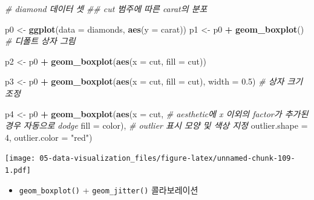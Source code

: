 \documentclass[
  11pt,
]{krantz}
\newenvironment{Shaded}{\begin{snugshade}}{\end{snugshade}}
\newcommand{\CommentTok}[1]{\textcolor[rgb]{0.37,0.37,0.37}{\textit{#1}}}
\newcommand{\DataTypeTok}[1]{\textcolor[rgb]{0.27,0.27,0.27}{#1}}
\newcommand{\DecValTok}[1]{\textcolor[rgb]{0.06,0.06,0.06}{#1}}
\newcommand{\FloatTok}[1]{\textcolor[rgb]{0.06,0.06,0.06}{#1}}
\newcommand{\KeywordTok}[1]{\textcolor[rgb]{0.27,0.27,0.27}{\textbf{#1}}}
\newcommand{\NormalTok}[1]{#1}
\newcommand{\OperatorTok}[1]{\textcolor[rgb]{0.43,0.43,0.43}{\textbf{#1}}}
\newcommand{\StringTok}[1]{\textcolor[rgb]{0.5,0.5,0.5}{#1}}
\providecommand{\tightlist}{%
  \setlength{\itemsep}{0pt}\setlength{\parskip}{0pt}}
\begin{document}
\begin{Shaded}
\begin{Highlighting}[]
\CommentTok{# diamond 데이터 셋}
\CommentTok{## cut 범주에 따른 carat의 분포}

\NormalTok{p0 <-}\StringTok{ }\KeywordTok{ggplot}\NormalTok{(}\DataTypeTok{data =}\NormalTok{ diamonds, }
             \KeywordTok{aes}\NormalTok{(}\DataTypeTok{y =}\NormalTok{ carat))}
\NormalTok{p1 <-}\StringTok{ }\NormalTok{p0 }\OperatorTok{+}\StringTok{ }
\StringTok{  }\KeywordTok{geom_boxplot}\NormalTok{() }\CommentTok{# 디폴트 상자 그림}

\NormalTok{p2 <-}\StringTok{ }\NormalTok{p0 }\OperatorTok{+}\StringTok{ }
\StringTok{  }\KeywordTok{geom_boxplot}\NormalTok{(}\KeywordTok{aes}\NormalTok{(}\DataTypeTok{x =}\NormalTok{ cut, }
                   \DataTypeTok{fill =}\NormalTok{ cut))}

\NormalTok{p3 <-}\StringTok{ }\NormalTok{p0 }\OperatorTok{+}\StringTok{ }
\StringTok{  }\KeywordTok{geom_boxplot}\NormalTok{(}\KeywordTok{aes}\NormalTok{(}\DataTypeTok{x =}\NormalTok{ cut, }
                   \DataTypeTok{fill =}\NormalTok{ cut), }
               \DataTypeTok{width =} \FloatTok{0.5}\NormalTok{) }\CommentTok{# 상자 크기 조정}

\NormalTok{p4 <-}\StringTok{ }\NormalTok{p0 }\OperatorTok{+}\StringTok{ }
\StringTok{  }\KeywordTok{geom_boxplot}\NormalTok{(}\KeywordTok{aes}\NormalTok{(}\DataTypeTok{x =}\NormalTok{ cut, }
\CommentTok{# aesthetic에 x 이외의 factor가 추가된 경우 자동으로 dodge                   }
                   \DataTypeTok{fill =}\NormalTok{ color), }
               \CommentTok{# outlier 표시 모양 및 색상 지정}
               \DataTypeTok{outlier.shape =} \DecValTok{4}\NormalTok{, }
               \DataTypeTok{outlier.color =} \StringTok{"red"}\NormalTok{)}
\end{Highlighting}
\end{Shaded}

\normalsize

\footnotesize

\texttt{[image: 05-data-visualization\_files/figure-latex/unnamed-chunk-109-1.pdf]}

\normalsize

\begin{itemize}
\tightlist
\item
  \texttt{geom\_boxplot()} + \texttt{geom\_jitter()} 콜라보레이션
\end{itemize}

\footnotesize
\end{document}
